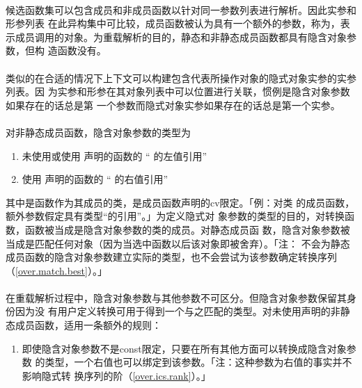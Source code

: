 \paragraph{}
候选函数集可以包含成员和非成员函数以针对同一参数列表进行解析。因此实参和形参列表
在此异构集中可比较，成员函数被认为具有一个额外的参数，称为，表
示成员调用的对象。为重载解析的目的，静态和非静态成员函数都具有隐含对象参数，但构
造函数没有。

\paragraph{}
类似的在合适的情况下上下文可以构建包含代表所操作对象的隐式对象实参的实参列表。因
为实参和形参在其对象列表中可以位置进行关联，惯例是隐含对象参数如果存在的话总是第
一个参数而隐式对象实参如果存在的话总是第一个实参。

\paragraph{}
对非静态成员函数，隐含对象参数的类型为
\begin{enumerate}
  \item{未使用或使用\tm{\&} 声明的函数的
    `` 的左值引用''}
  \item{使用\tm{\&\&} 声明的函数的
    `` 的右值引用''}
\end{enumerate}
其中是函数作为其成员的类，是成员函数声明的cv限定。「例：对类
的成员函数，额外参数假定具有类型``的引用''。」为定义隐式对
象参数的类型的目的，对转换函数，函数被当成是隐含对象参数的类的成员。对静态成员函
数，隐含对象参数被当成是匹配任何对象（因为当选中函数以后该对象即被舍弃）。「注：
不会为静态成员函数的隐含对象参数建立实际的类型，也不会尝试为该参数确定转换序列
（\ref{over.match.best}）。」

\paragraph{}
在重载解析过程中，隐含对象参数与其他参数不可区分。但隐含对象参数保留其身份因为没
有用户定义转换可用于得到一个与之匹配的类型。对未使用声明的非静
态成员函数，适用一条额外的规则：
\begin{enumerate}
  \item{即使隐含对象参数不是const限定，只要在所有其他方面可以转换成隐含对象参数
    的类型，一个右值也可以绑定到该参数。「注：这种参数为右值的事实并不影响隐式转
    换序列的阶（\ref{over.ics.rank}）。」}
\end{enumerate}

